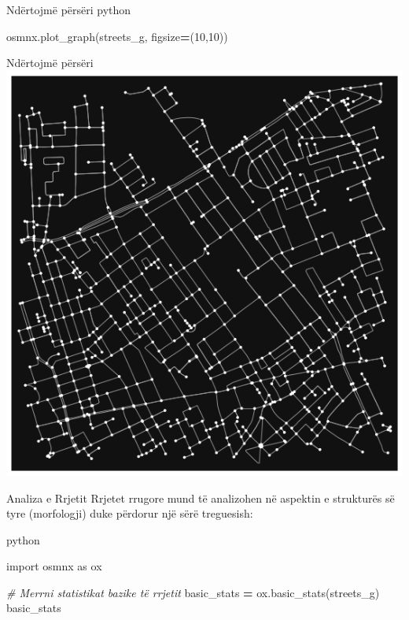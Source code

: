 \documentclass[
  ignorenonframetext,
]{beamer}
\newenvironment{Shaded}{\begin{snugshade}}{\end{snugshade}}
\newcommand{\CommentTok}[1]{\textcolor[rgb]{0.56,0.35,0.01}{\textit{#1}}}
\newcommand{\DecValTok}[1]{\textcolor[rgb]{0.00,0.00,0.81}{#1}}
\newcommand{\ImportTok}[1]{#1}
\newcommand{\NormalTok}[1]{#1}
\newcommand{\OperatorTok}[1]{\textcolor[rgb]{0.81,0.36,0.00}{\textbf{#1}}}
\begin{document}
\begin{frame}[fragile]{Ndërtojmë përsëri}
\protect\hypertarget{nduxebrtojmuxeb-puxebrsuxebri}{}
python

\begin{Shaded}
\begin{Highlighting}[]
\NormalTok{osmnx.plot\_graph(streets\_g, figsize}\OperatorTok{=}\NormalTok{(}\DecValTok{10}\NormalTok{,}\DecValTok{10}\NormalTok{))}
\end{Highlighting}
\end{Shaded}
\end{frame}

\begin{frame}{Ndërtojmë përsëri}
\protect\hypertarget{nduxebrtojmuxeb-puxebrsuxebri-1}{}
\includegraphics{./Figs/osmx3.png}
\end{frame}

\begin{frame}[fragile]{Analiza e Rrjetit}
\protect\hypertarget{analiza-e-rrjetit}{}
Rrjetet rrugore mund të analizohen në aspektin e strukturës së tyre
(morfologji) duke përdorur një sërë treguesish:

python

\begin{Shaded}
\begin{Highlighting}[]
\ImportTok{import}\NormalTok{ osmnx }\ImportTok{as}\NormalTok{ ox}

\CommentTok{\# Merrni statistikat bazike të rrjetit}
\NormalTok{basic\_stats }\OperatorTok{=}\NormalTok{ ox.basic\_stats(streets\_g)}
\NormalTok{basic\_stats}
\end{Highlighting}
\end{Shaded}
\end{frame}
\end{document}

